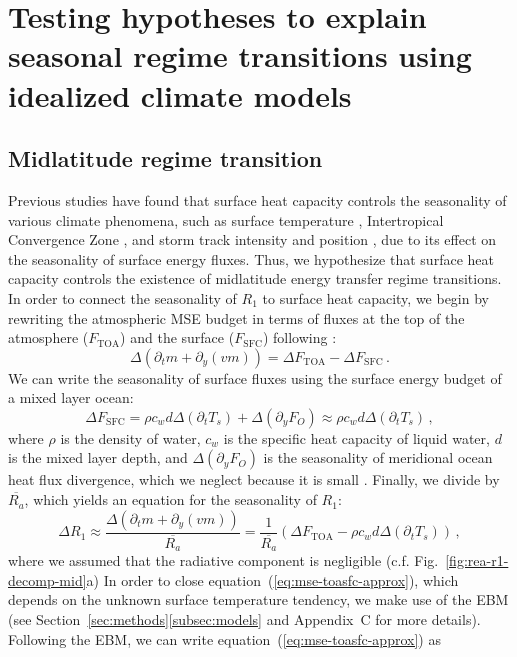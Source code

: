 \documentclass{ametsocV5}
\begin{document}
\section{Testing hypotheses to explain seasonal regime transitions using idealized climate models} \label{sec:hypo}
  \subsection{Midlatitude regime transition} \label{subsec:mld}
  Previous studies have found that surface heat capacity controls the seasonality of various climate phenomena, such as surface temperature \citep{donohoe2014}, Intertropical Convergence Zone \citep{bordoni2008}, and storm track intensity and position \citep{barpanda2020}, due to its effect on the seasonality of surface energy fluxes. Thus, we hypothesize that surface heat capacity controls the existence of midlatitude energy transfer regime transitions. In order to connect the seasonality of $R_1$ to surface heat capacity, we begin by rewriting the atmospheric MSE budget in terms of fluxes at the top of the atmosphere ($F_\mathrm{TOA}$) and the surface ($F_\mathrm{SFC}$) following \cite{barpanda2020}:
  \begin{equation}\label{eq:mse-toasfc}
    \Delta\left(\partial_t m + \partial_y (vm) \right) = \Delta F_{\mathrm{TOA}} - \Delta F_{\mathrm{SFC}} \, .
  \end{equation}
  We can write the seasonality of surface fluxes using the surface energy budget of a mixed layer ocean:
  \begin{equation}
    \Delta F_{\mathrm{SFC}} = \rho c_{w} d \Delta\left(\partial_t T_{s}\right) + \Delta ( \partial_y F_{O}) \approx \rho c_{w} d \Delta\left(\partial_t T_{s}\right) \, ,
  \end{equation}
  where $\rho$ is the density of water, $c_w$ is the specific heat capacity of liquid water, $d$ is the mixed layer depth, and $\Delta(\partial_y F_O)$ is the seasonality of meridional ocean heat flux divergence, which we neglect because it is small \citep{roberts2017}. Finally, we divide by $\overline{R_a}$, which yields an equation for the seasonality of $R_1$:
  \begin{equation}\label{eq:mse-toasfc-approx}
    \Delta R_1 \approx \frac{\Delta\left(\partial_t m + \partial_y (vm) \right)}{\overline{R_a}} = \frac{1}{\overline{R_a}} \left(\Delta F_{\mathrm{TOA}} - \rho c_{w} d \Delta\left(\partial_t T_{s}\right)\right) \, , 
  \end{equation}
  where we assumed that the radiative component is negligible (c.f. Fig.~\ref{fig:rea-r1-decomp-mid}a) In order to close equation~(\ref{eq:mse-toasfc-approx}), which depends on the unknown surface temperature tendency, we make use of the EBM (see Section~\ref{sec:methods}\ref{subsec:models} and Appendix~C for more details). Following the EBM, we can write equation~(\ref{eq:mse-toasfc-approx}) as
\end{document}
